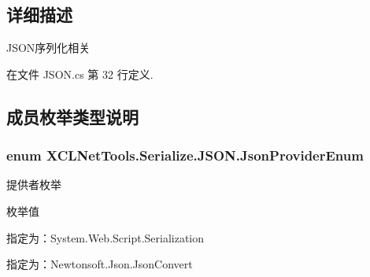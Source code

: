 \subsection{详细描述}
J\-S\-O\-N序列化相关 



在文件 J\-S\-O\-N.\-cs 第 32 行定义.



\subsection{成员枚举类型说明}
\hypertarget{class_x_c_l_net_tools_1_1_serialize_1_1_j_s_o_n_acb00f7258e4dedfaa0cec15ce9335a31}{
\subsubsection[{Json\-Provider\-Enum}]{\setlength{\rightskip}{0pt plus 5cm}enum {\bf X\-C\-L\-Net\-Tools.\-Serialize.\-J\-S\-O\-N.\-Json\-Provider\-Enum}}}\label{class_x_c_l_net_tools_1_1_serialize_1_1_j_s_o_n_acb00f7258e4dedfaa0cec15ce9335a31}


提供者枚举 

\begin{Desc}
\item[枚举值]\par
\begin{description}
\item[{\em 
\hypertarget{class_x_c_l_net_tools_1_1_serialize_1_1_j_s_o_n_acb00f7258e4dedfaa0cec15ce9335a31a67a1b1b70420ea0e3be332a9dedcb83e}{System\-Web}\label{class_x_c_l_net_tools_1_1_serialize_1_1_j_s_o_n_acb00f7258e4dedfaa0cec15ce9335a31a67a1b1b70420ea0e3be332a9dedcb83e}
}]指定为：\-System.\-Web.\-Script.\-Serialization \item[{\em 
\hypertarget{class_x_c_l_net_tools_1_1_serialize_1_1_j_s_o_n_acb00f7258e4dedfaa0cec15ce9335a31a3dae1400047ce0f8033b4d8f2815fc92}{Newtonsoft}\label{class_x_c_l_net_tools_1_1_serialize_1_1_j_s_o_n_acb00f7258e4dedfaa0cec15ce9335a31a3dae1400047ce0f8033b4d8f2815fc92}
}]指定为：\-Newtonsoft.\-Json.\-Json\-Convert \end{description}
\end{Desc}


